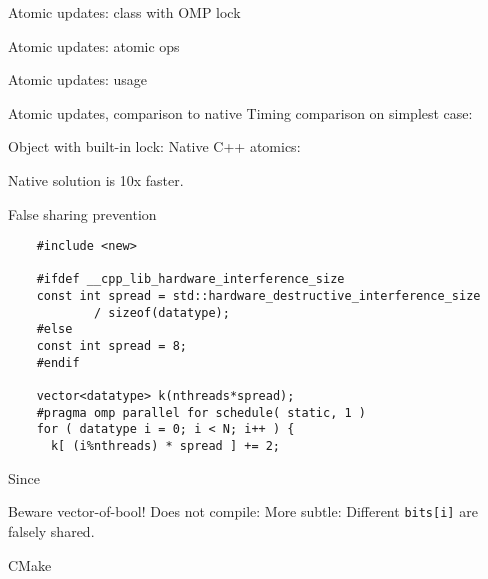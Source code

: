 \documentclass[10pt]{beamer}
\begin{document}
\begin{numberedframe}{Atomic updates: class with OMP lock}
\end{numberedframe}

\begin{numberedframe}{Atomic updates: atomic ops}
\end{numberedframe}

\begin{numberedframe}{Atomic updates: usage}
\end{numberedframe}

\begin{numberedframe}{Atomic updates, comparison to native}
  Timing comparison on simplest case:
\begin{multicols}{2}
  \let\snippetoutputsize\scriptsize
  Object with built-in lock:
\columnbreak
Native C++ atomics:
\end{multicols}

  Native solution is 10x faster.

\end{numberedframe}

\begin{numberedframe}{False sharing prevention}
  \begin{lstlisting}
    #include <new>

    #ifdef __cpp_lib_hardware_interference_size
    const int spread = std::hardware_destructive_interference_size
            / sizeof(datatype);
    #else
    const int spread = 8;
    #endif

    vector<datatype> k(nthreads*spread);
    #pragma omp parallel for schedule( static, 1 )
    for ( datatype i = 0; i < N; i++ ) {
      k[ (i%nthreads) * spread ] += 2;
  \end{lstlisting}
  Since 
\end{numberedframe}

\begin{numberedframe}{Beware vector-of-bool!}
  Does not compile:
  More subtle:
  Different \lstinline{bits[i]} are falsely shared.
\end{numberedframe}

\begin{numberedframe}{CMake}
  
\end{numberedframe}
\end{document}
